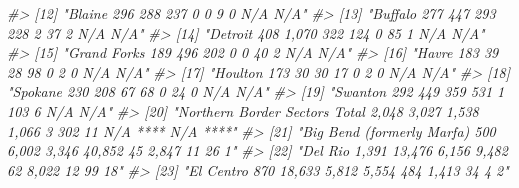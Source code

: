 \documentclass[
  12pt,
]{book}
\newenvironment{Shaded}{\begin{snugshade}}{\end{snugshade}}
\newcommand{\CommentTok}[1]{\textcolor[rgb]{0.56,0.35,0.01}{\textit{#1}}}
\begin{document}
\begin{Shaded}
\begin{Highlighting}[]
\CommentTok{\#> [12] "Blaine                                            296                288                      237                       0                0                9               0           N/A     N/A"   }
\CommentTok{\#> [13] "Buffalo                                           277                447                      293                     228               2                37               2           N/A     N/A"   }
\CommentTok{\#> [14] "Detroit                                           408               1,070                     322                     124               0                85               1           N/A     N/A"   }
\CommentTok{\#> [15] "Grand Forks                                       189                496                      202                       0                0               40               2           N/A     N/A"   }
\CommentTok{\#> [16] "Havre                                             183                 39                       28                      98                0                2               0           N/A     N/A"   }
\CommentTok{\#> [17] "Houlton                                           173                 30                       30                      17                0                2               0           N/A     N/A"   }
\CommentTok{\#> [18] "Spokane                                           230                208                       67                      68                0               24               0           N/A     N/A"   }
\CommentTok{\#> [19] "Swanton                                           292                449                      359                     531                1              103               6           N/A     N/A"   }
\CommentTok{\#> [20] "Northern Border Sectors Total                    2,048              3,027                    1,538                   1,066               3              302              11        N/A **** N/A ****"}
\CommentTok{\#> [21] "Big Bend (formerly Marfa)                         500               6,002                   3,346                   40,852              45             2,847             11            26      1"    }
\CommentTok{\#> [22] "Del Rio                                          1,391             13,476                    6,156                   9,482              62             8,022             12            99     18"    }
\CommentTok{\#> [23] "El Centro                                         870              18,633                    5,812                   5,554             484             1,413             34             4      2"    }

\end{Highlighting}
\end{Shaded}
\end{document}
